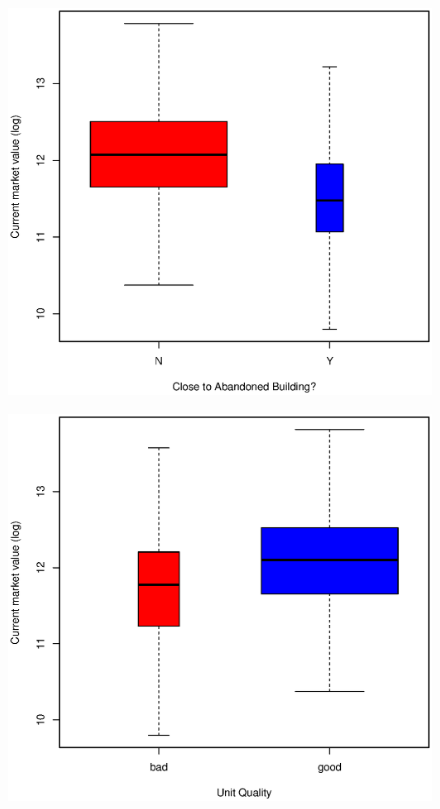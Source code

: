 \documentclass[11pt, fleqn]{article}
\begin{document}
\begin{figure}[!htb]
  \centering
  \includegraphics[scale=.5]{eaban.eps}
  \caption{}
  \label{fig:eaban.eps}
\end{figure}

\begin{figure}[!htb]
  \centering
  \includegraphics[scale=.5]{howh.eps}
  \caption{}
  \label{fig:howh}
\end{figure}
\end{document}
